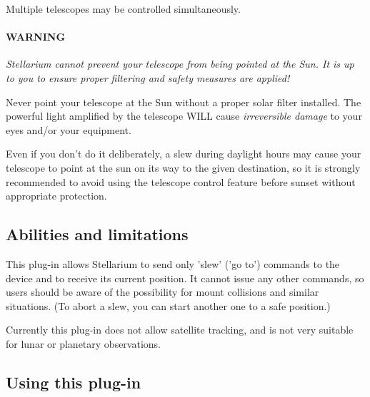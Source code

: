 Multiple telescopes may be controlled simultaneously. 

% 
% 

\paragraph{WARNING}\emph{Stellarium cannot prevent your
telescope from being pointed at the Sun. It is up to you to ensure
proper filtering and safety measures are applied!}

Never point your telescope at the Sun without a proper solar filter
installed. The powerful light amplified by the telescope WILL cause
\emph{irreversible damage} to your eyes and/or your equipment.

Even if you don't do it deliberately, a slew during daylight hours may
cause your telescope to point at the sun on its way to the given
destination, so it is strongly recommended to avoid using the
telescope control feature before sunset without appropriate
protection.



\subsection{Abilities and limitations}
\label{sec:sec:plugins:TelescopeControl:Linitaitons}

This plug-in allows Stellarium to send only 'slew' ('go to') commands
to the device and to receive its current position. It cannot issue any
other commands, so users should be aware of the possibility for mount
collisions and similar situations. (To abort a slew, you can start
another one to a safe position.)

Currently this plug-in does not allow satellite tracking, and is not
very suitable for lunar or planetary observations.

\subsection{Using this plug-in}
\label{sec:plugins:TelescopeControl:using}

